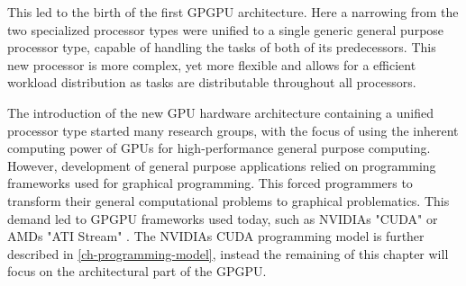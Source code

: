 This led to the birth of the first GPGPU architecture. 
Here a narrowing from the two specialized processor types were unified to a single generic general purpose processor type, capable of handling the tasks of both of its predecessors.
This new processor is more complex, yet more flexible and allows for a efficient workload distribution as tasks are distributable throughout all processors.

The introduction of the new GPU hardware architecture containing a unified processor type started many research groups, with the focus of using the inherent computing power of GPUs for high-performance general purpose computing.
However, development of general purpose applications relied on programming frameworks used for graphical programming.
This forced programmers to transform their general computational problems to graphical problematics.
This demand led to GPGPU frameworks used today, such as NVIDIAs "CUDA" or AMDs "ATI Stream" \cite{Johansson2010}.
The NVIDIAs CUDA programming model is further described in \cref{ch-programming-model}, instead the remaining of this chapter will focus on the architectural part of the GPGPU.